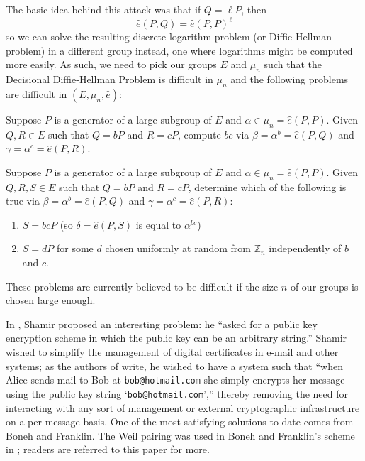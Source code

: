 The basic idea behind this attack was that if $Q = \ell P$, then
\[
\widehat{e}(P, Q)
    = \widehat{e}(P, P)^\ell 
\]
    so we can solve the resulting discrete logarithm problem (or Diffie-Hellman
    problem) in a different group instead, one where logarithms might be
    computed more easily.
As such, we need to pick our groups $E$ and $\mu_n$ such that the Decisional
    Diffie-Hellman Problem is difficult in $\mu_n$ and the following problems
    are difficult in $(E, \mu_n, \widehat{e})$:
\begin{prob}
Suppose $P$ is a generator of a large subgroup of $E$ and $\alpha \in
    \mu_n = \widehat{e}(P, P)$.
Given $Q, R \in E$ such that $Q = bP$ and $R = cP$, compute $bc$ via $\beta =
    \alpha^b = \widehat{e}(P, Q)$ and $\gamma = \alpha^c = \widehat{e}(P, R)$.
\end{prob}
\begin{prob}
Suppose $P$ is a generator of a large subgroup of $E$ and $\alpha \in \mu_n =
    \widehat{e}(P, P)$.
Given $Q, R, S \in E$ such that $Q = bP$ and $R = cP$, determine which of the
    following is true  via $\beta = \alpha^b = \widehat{e}(P, Q)$ and $\gamma =
    \alpha^c = \widehat{e}(P, R)$:
\begin{enumerate}
\item   $S = bcP$ (so $\delta = \widehat{e}(P, S)$ is equal to $\alpha^{bc}$)
\item   $S = dP$ for some $d$ chosen uniformly at random from $\mathbb{Z}_n$
    independently of $b$ and $c$.
\end{enumerate}
\end{prob}
These problems are currently believed to be difficult if the size $n$ of our
    groups is chosen large enough.

In \cite{shamir1985identity}, Shamir proposed an interesting problem: he
    ``asked for a public key encryption scheme in which the public key can be
    an arbitrary string.'' \cite{boneh2001identity}
Shamir wished to simplify the management of digital certificates in e-mail and
    other systems; as the authors of \cite{boneh2001identity} write, he wished
    to have a system such that ``when Alice sends mail to Bob at
    \texttt{bob@hotmail.com} she simply encrypts her message using the public
    key string `\texttt{bob@hotmail.com}','' thereby removing the need for
    interacting with any sort of management or external cryptographic
    infrastructure on a per-message basis.
One of the most satisfying solutions to date comes from Boneh and Franklin.
The Weil pairing was used in Boneh and Franklin's scheme in
    \cite{boneh2001identity}; readers are referred to this paper for more.

